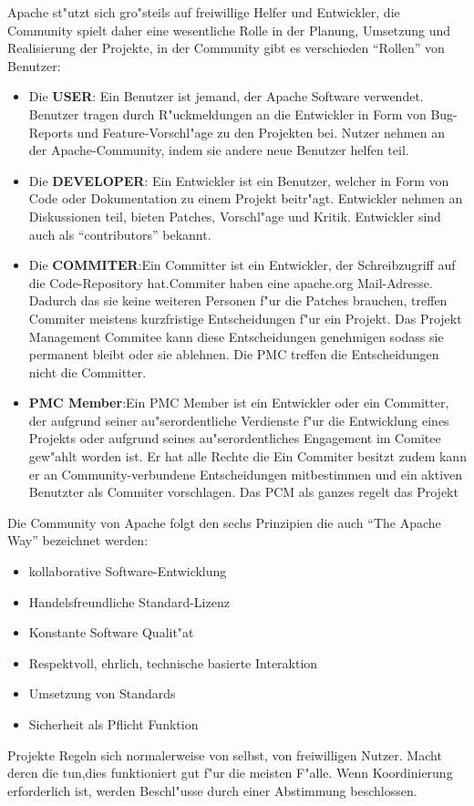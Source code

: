 Apache st"utzt sich gro"steils auf  freiwillige Helfer und Entwickler, die Community spielt daher eine wesentliche Rolle in der Planung, Umsetzung und Realisierung der Projekte, in der Community gibt es verschieden ``Rollen'' von Benutzer:
\begin{itemize}
\item{Die \textbf{USER}: Ein Benutzer ist jemand, der Apache Software verwendet. Benutzer tragen durch R"uckmeldungen an die Entwickler in Form von Bug-Reports und Feature-Vorschl"age zu den Projekten bei. Nutzer nehmen an der Apache-Community, indem sie andere neue Benutzer helfen teil.}
\item{Die \textbf{DEVELOPER}: Ein Entwickler ist ein Benutzer, welcher in Form von Code oder Dokumentation zu einem Projekt beitr"agt. Entwickler nehmen an Diskussionen teil, bieten Patches, Vorschl"age und Kritik. Entwickler sind auch als  ``contributors'' bekannt.}
\item{Die \textbf{COMMITER}:Ein Committer ist ein Entwickler, der Schreibzugriff auf die Code-Repository hat.Commiter haben eine apache.org Mail-Adresse. Dadurch das sie keine weiteren Personen f"ur die Patches brauchen, treffen Commiter meistens kurzfristige Entscheidungen f"ur ein Projekt. Das Projekt Management Commitee kann diese Entscheidungen genehmigen sodass sie permanent bleibt oder sie ablehnen. Die PMC treffen die Entscheidungen nicht die Committer.}
\item{\textbf{PMC Member}:Ein PMC Member ist ein Entwickler oder ein Committer, der aufgrund seiner au"serordentliche Verdienste f"ur die Entwicklung eines Projekts oder aufgrund seines au"serordentliches  Engagement im Comitee gew"ahlt worden ist. Er hat alle Rechte die Ein Commiter besitzt zudem kann er an Community-verbundene Entscheidungen mitbestimmen und ein aktiven Benutzter als Commiter vorschlagen. Das PCM als ganzes regelt das Projekt }
\end{itemize}
\newpage
Die Community von Apache folgt den sechs Prinzipien die auch ``The Apache Way'' bezeichnet werden:
\begin{itemize}
\item{kollaborative Software-Entwicklung}
\item{Handelsfreundliche Standard-Lizenz}
\item{Konstante Software Qualit"at}
\item{Respektvoll, ehrlich, technische basierte Interaktion}
\item{Umsetzung von Standards}
\item{Sicherheit als Pflicht Funktion}
\end{itemize}
Projekte Regeln sich normalerweise von selbst, von freiwilligen Nutzer. Macht deren die tun,dies funktioniert gut f"ur die meisten F"alle. Wenn Koordinierung erforderlich ist, werden Beschl"usse durch einer Abstimmung beschlossen.
